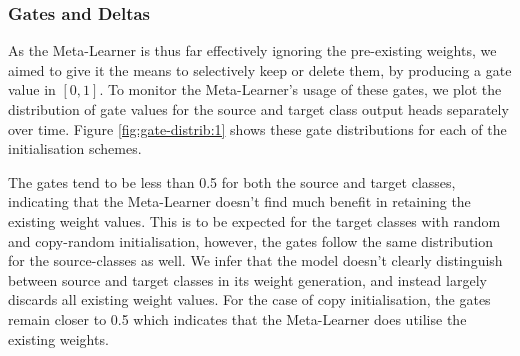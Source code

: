 \documentclass{report}
\begin{document}
\subsubsection{Gates and Deltas}
As the Meta-Learner is thus far effectively ignoring the pre-existing weights, we aimed to give it the means to selectively keep or delete them, by producing a gate value in $[0, 1]$. To monitor the Meta-Learner's usage of these gates, we plot the distribution of gate values for the source and target class output heads separately over time. Figure \ref{fig:gate-distrib:1} shows these gate distributions for each of the initialisation schemes. \par
The gates tend to be less than 0.5 for both the source and target classes, indicating that the Meta-Learner doesn't find much benefit in retaining the existing weight values. This is to be expected for the target classes with random and copy-random initialisation, however, the gates follow the same distribution for the source-classes as well. We infer that the model doesn't clearly distinguish between source and target classes in its weight generation, and instead largely discards all existing weight values. For the case of copy initialisation, the gates remain closer to 0.5 which indicates that the Meta-Learner does utilise the existing weights. \par
\end{document}
